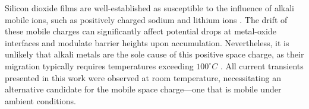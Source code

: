 


\noindent Silicon dioxide films are well-established as susceptible to the influence of alkali mobile ions, such as positively charged sodium and lithium ions \cite{snow1965ion, yon1966sodium}. The drift of these mobile charges can significantly affect potential drops at metal-oxide interfaces and modulate barrier heights upon accumulation. Nevertheless, it is unlikely that alkali metals are the sole cause of this positive space charge, as their migration typically requires temperatures exceeding $100^\circ C$ \cite{deal1974current}. All current transients presented in this work were observed at room temperature, necessitating an alternative candidate for the mobile space charge—one that is mobile under ambient conditions.\\


